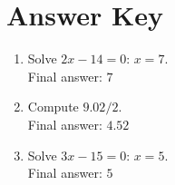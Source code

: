\documentclass[12pt]{article}
\begin{document}
\section*{Answer Key}

\begin{enumerate}
  \item Solve $2x - 14 = 0$: $x = 7$.\\
        Final answer: $\boxed{7}$
  \item Compute $9.02 / 2$.\\
        Final answer: $\boxed{4.52}$
  \item Solve $3x - 15 = 0$: $x = 5$.\\
        Final answer: $\boxed{5}$
\end{enumerate}
\end{document}
